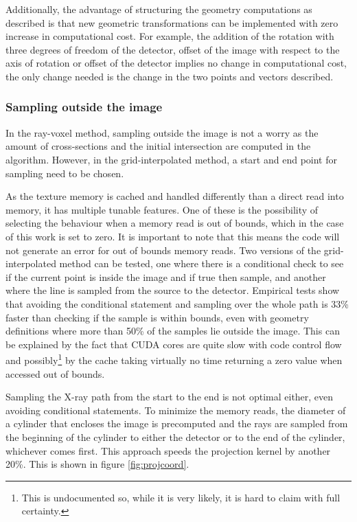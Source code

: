 Additionally, the advantage of structuring the geometry computations as described is that new geometric transformations can be implemented with zero increase in computational cost. For example, the addition of the rotation with three degrees of freedom of the detector, offset of the image with respect to the axis of rotation or offset of the detector implies no change in computational cost, the only change needed is the change in the two points and vectors described.
 
\subsubsection{Sampling outside the image}

In the ray-voxel method, sampling outside the image is not a worry as the amount of cross-sections and the initial intersection are computed in the algorithm. However, in the grid-interpolated method, a start and end point for sampling need to be chosen. 

As the texture memory is cached and handled differently than a direct read into memory, it has multiple tunable features. One of these is the possibility of selecting the behaviour when a memory read is out of bounds, which in the case of this work is set to zero. It is important to note that this means the code will not generate an error for out of bounds memory reads. Two versions of the grid-interpolated method can be tested, one where there is a conditional check to see if the current point is inside the image and if true then sample, and another where the line is sampled from the source to the detector. Empirical tests show that avoiding the conditional statement and sampling over the whole path is 33\% faster than checking if the sample is within bounds, even with geometry definitions where more than 50\% of the samples lie outside the image. This can be explained by the fact that CUDA cores are quite slow with code control flow and possibly\footnote{This is undocumented so, while it is very likely, it is hard to claim with full certainty.} by the cache taking virtually no time returning a zero value when accessed out of bounds. 

Sampling the X-ray path from the start to the end is not optimal either, even avoiding conditional statements. To minimize the memory reads, the diameter of a cylinder that encloses the image is precomputed and the rays are sampled from the beginning of the cylinder to either the detector or to the end of the cylinder, whichever comes first. This approach speeds the projection kernel by another 20\%. This is shown in figure \ref{fig:projcoord}.

